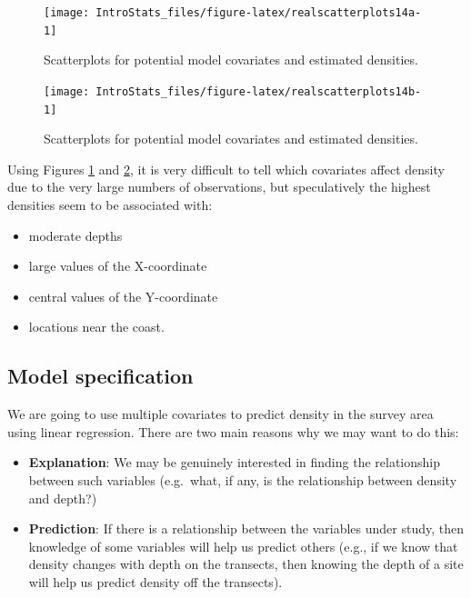 \documentclass[
  oneside]{krantz}
\providecommand{\tightlist}{%
  \setlength{\itemsep}{0pt}\setlength{\parskip}{0pt}}
\begin{document}
\begin{figure}

{\centering \texttt{[image: IntroStats\_files/figure-latex/realscatterplots14a-1]} 

}

\caption{Scatterplots for potential model covariates and estimated densities.}\label{fig:realscatterplots14a}
\end{figure}

\begin{figure}

{\centering \texttt{[image: IntroStats\_files/figure-latex/realscatterplots14b-1]} 

}

\caption{Scatterplots for potential model covariates and estimated densities.}\label{fig:realscatterplots14b}
\end{figure}

Using Figures \ref{fig:realscatterplots14a} and \ref{fig:realscatterplots14b}, it is very difficult to tell which covariates affect density due to the very large numbers of observations, but speculatively the highest densities seem to be associated with:

\begin{itemize}
\tightlist
\item
  moderate depths
\item
  large values of the X-coordinate
\item
  central values of the Y-coordinate
\item
  locations near the coast.
\end{itemize}

\hypertarget{model-specification-1}{%
\subsection{Model specification}\label{model-specification-1}}

We are going to use multiple covariates to predict density in the survey area
using linear regression. There are two main reasons why we may want to do this:

\begin{itemize}
\tightlist
\item
  \textbf{Explanation}: We may be genuinely interested in finding the relationship between such variables (e.g.~what, if any, is the relationship between density and depth?)
\item
  \textbf{Prediction}: If there is a relationship between the variables under study, then knowledge of some variables will help us predict others (e.g., if we know that density changes with depth on the transects, then knowing the depth of a site will help us predict density off the transects).
\end{itemize}
\end{document}
